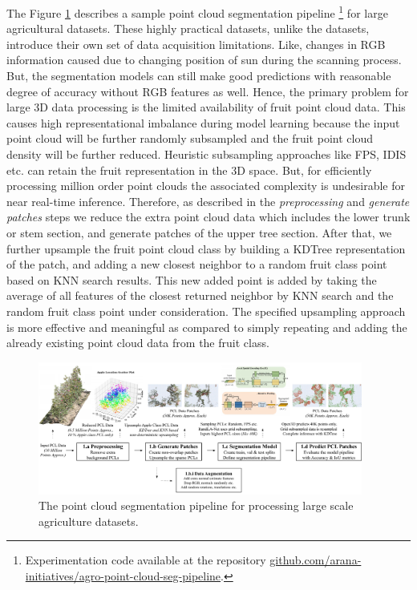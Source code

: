 \documentclass{article}
\begin{document}
The Figure \ref{fig:pipeline} describes a sample point cloud segmentation pipeline \footnote{ Experimentation code available at the repository \href{https://github.com/arana-initiatives/agro-point-cloud-seg-pipeline}{github.com/arana-initiatives/agro-point-cloud-seg-pipeline}.} for large agricultural datasets.
These highly practical datasets, unlike the datasets, introduce their own set of data acquisition limitations.
Like, changes in RGB information caused due to changing position of sun during the scanning process.
But, the segmentation models can still make good predictions with reasonable degree of accuracy without RGB features as well.
Hence, the primary problem for large 3D data processing is the limited availability of fruit point cloud data.
This causes high representational imbalance during model learning because the input point cloud will be further randomly subsampled and the fruit point cloud density will be further reduced.
Heuristic subsampling approaches like FPS, IDIS etc. can retain the fruit representation in the 3D space.
But, for efficiently processing million order point clouds the associated complexity is undesirable for near real-time inference.
Therefore, as described in the \textit{preprocessing} and \textit{generate patches} steps we reduce the extra point cloud data which includes the lower trunk or stem section, and generate patches of the upper tree section.
After that, we further upsample the fruit point cloud class by building a KDTree representation of the patch, and adding a new closest neighbor to a random fruit class point based on KNN search results.
This new added point is added by taking the average of all features of the closest returned neighbor by KNN search and the random fruit class point under consideration.
The specified upsampling approach is more effective and meaningful as compared to simply repeating and adding the already existing point cloud data from the fruit class.


\begin{figure}[h]
    \centering
    \includegraphics[width=0.95\textwidth]{point-cloud-data-processing-pipeline.pdf}
    \caption{The point cloud segmentation pipeline for processing large scale agriculture datasets.}
    \label{fig:pipeline}
\end{figure}
\end{document}
